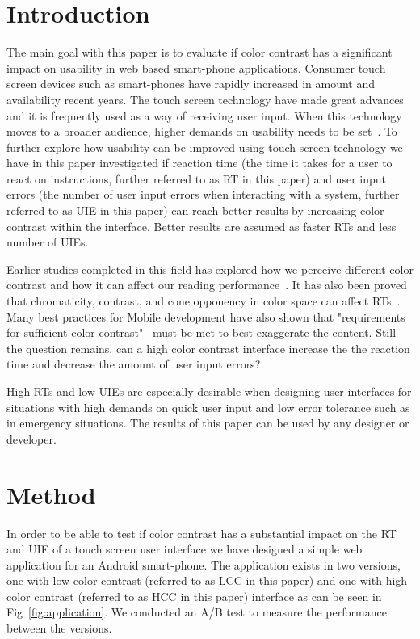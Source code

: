 \documentclass[runningheads,a4paper]{llncs}
\begin{document}
\section{Introduction}
The main goal with this paper is to evaluate if color contrast has a significant impact on usability in web based smart-phone applications. Consumer touch screen devices such as smart-phones have rapidly increased in amount and availability recent years. The touch screen technology have made great advances~\cite{jennings2013touch} and it is frequently used as a way of receiving user input. When this technology moves to a broader audience, higher demands on usability needs to be set~\cite{gong2004guidelines}. To further explore how usability can be improved using touch screen technology we have in this paper investigated if reaction time (the time it takes for a user to react on instructions, further referred to as RT in this paper) and user input errors (the number of user input errors when interacting with a system, further referred to as UIE in this paper) can reach better results by increasing color contrast within the interface. Better results are assumed as faster RTs and less number of UIEs. 

Earlier studies completed in this field has explored how we perceive different color contrast and how it can affect our reading performance~\cite{wu2003improving}. It has also been proved that chromaticity, contrast, and cone opponency in color space can affect RTs~\cite{mckeefry2003simple}. Many best practices for Mobile development have also shown that "requirements for sufficient color contrast"~\cite{marcus2013design} must be met to best exaggerate the content. Still the question remains, can a high color contrast interface increase the the reaction time and decrease the amount of user input errors?

High RTs and low UIEs are especially desirable when designing user interfaces for situations with high demands on quick user input and low error tolerance such as in emergency situations. The results of this paper can be used by any designer or developer.

\section{Method}
In order to be able to test if color contrast has a substantial impact on the RT and UIE of a touch screen user interface we have designed a simple web application for an Android smart-phone. The application exists in two versions, one with low color contrast (referred to as LCC in this paper) and one with high color contrast (referred to as HCC in this paper) interface as can be seen in Fig~\ref{fig:application}. We conducted an A/B test to measure the performance between the versions.
\end{document}
